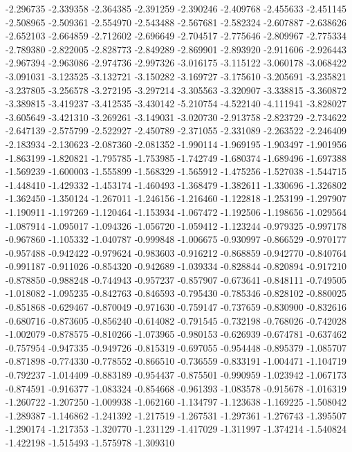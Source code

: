 -2.296735
-2.339358
-2.364385
-2.391259
-2.390246
-2.409768
-2.455633
-2.451145
-2.508965
-2.509361
-2.554970
-2.543488
-2.567681
-2.582324
-2.607887
-2.638626
-2.652103
-2.664859
-2.712602
-2.696649
-2.704517
-2.775646
-2.809967
-2.775334
-2.789380
-2.822005
-2.828773
-2.849289
-2.869901
-2.893920
-2.911606
-2.926443
-2.967394
-2.963086
-2.974736
-2.997326
-3.016175
-3.115122
-3.060178
-3.068422
-3.091031
-3.123525
-3.132721
-3.150282
-3.169727
-3.175610
-3.205691
-3.235821
-3.237805
-3.256578
-3.272195
-3.297214
-3.305563
-3.320907
-3.338815
-3.360872
-3.389815
-3.419237
-3.412535
-3.430142
-5.210754
-4.522140
-4.111941
-3.828027
-3.605649
-3.421310
-3.269261
-3.149031
-3.020730
-2.913758
-2.823729
-2.734622
-2.647139
-2.575799
-2.522927
-2.450789
-2.371055
-2.331089
-2.263522
-2.246409
-2.183934
-2.130623
-2.087360
-2.081352
-1.990114
-1.969195
-1.903497
-1.901956
-1.863199
-1.820821
-1.795785
-1.753985
-1.742749
-1.680374
-1.689496
-1.697388
-1.569239
-1.600003
-1.555899
-1.568329
-1.565912
-1.475256
-1.527038
-1.544715
-1.448410
-1.429332
-1.453174
-1.460493
-1.368479
-1.382611
-1.330696
-1.326802
-1.362450
-1.350124
-1.267011
-1.246156
-1.216460
-1.122818
-1.253199
-1.297907
-1.190911
-1.197269
-1.120464
-1.153934
-1.067472
-1.192506
-1.198656
-1.029564
-1.087914
-1.095017
-1.094326
-1.056720
-1.059412
-1.123244
-0.979325
-0.997178
-0.967860
-1.105332
-1.040787
-0.999848
-1.006675
-0.930997
-0.866529
-0.970177
-0.957488
-0.942422
-0.979624
-0.983603
-0.916212
-0.868859
-0.942770
-0.840764
-0.991187
-0.911026
-0.854320
-0.942689
-1.039334
-0.828844
-0.820894
-0.917210
-0.878850
-0.988248
-0.744943
-0.957237
-0.857907
-0.673641
-0.848111
-0.749505
-1.018082
-1.095235
-0.842763
-0.846593
-0.795430
-0.785346
-0.828102
-0.880025
-0.851868
-0.629467
-0.870049
-0.971630
-0.759147
-0.737659
-0.830900
-0.832616
-0.680716
-0.873605
-0.856240
-0.614082
-0.791545
-0.732198
-0.768026
-0.742028
-1.002079
-0.878575
-0.810266
-1.073965
-0.980153
-0.626939
-0.674781
-0.637462
-0.757954
-0.947335
-0.949726
-0.815319
-0.697055
-0.954448
-0.895379
-1.085707
-0.871898
-0.774330
-0.778552
-0.866510
-0.736559
-0.833191
-1.004471
-1.104719
-0.792237
-1.014409
-0.883189
-0.954437
-0.875501
-0.990959
-1.023942
-1.067173
-0.874591
-0.916377
-1.083324
-0.854668
-0.961393
-1.083578
-0.915678
-1.016319
-1.260722
-1.207250
-1.009938
-1.062160
-1.134797
-1.123638
-1.169225
-1.508042
-1.289387
-1.146862
-1.241392
-1.217519
-1.267531
-1.297361
-1.276743
-1.395507
-1.290174
-1.217353
-1.320770
-1.231129
-1.417029
-1.311997
-1.374214
-1.540824
-1.422198
-1.515493
-1.575978
-1.309310
